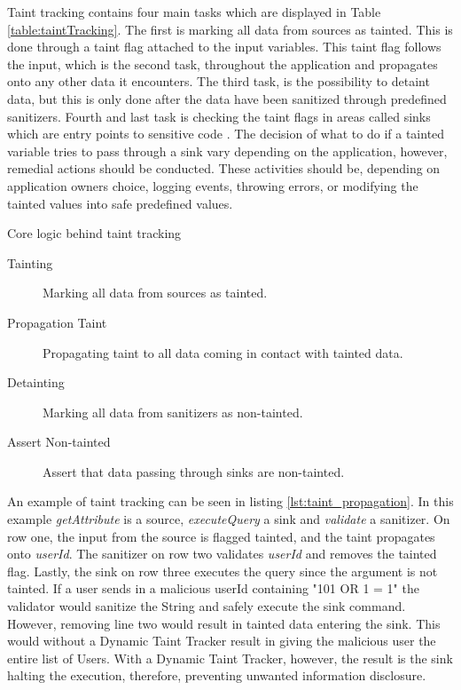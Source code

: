 Taint tracking contains four main tasks which are displayed in Table \ref{table:taintTracking}. The first is marking all data from sources as tainted. This is done through a taint flag attached to the input variables. This taint flag follows the input, which is the second task, throughout the application and propagates onto any other data it encounters. The third task, is the possibility to detaint data, but this is only done after the data have been sanitized through predefined sanitizers. Fourth and last task is checking the taint flags in areas called sinks which are entry points to sensitive code \parencite{Pan2015, Venkataramani2008}. The decision of what to do if a tainted variable tries to pass through a sink vary depending on the application, however, remedial actions should be conducted. These activities should be, depending on application owners choice, logging events, throwing errors, or modifying the tainted values into safe predefined values. 

\begin{table}[!hbt]
  \centering
  \caption{Core logic behind taint tracking}
  \label{table:taintTracking}
  \begin{description}
    \item [Tainting] Marking all data from sources as tainted.
    \item [Propagation Taint] Propagating taint to all data coming in contact with tainted data.
    \item [Detainting] Marking all data from sanitizers as non-tainted.
    \item [Assert Non-tainted] Assert that data passing through sinks are non-tainted. 
  \end{description}
\end{table}

An example of taint tracking can be seen in listing \ref{lst:taint_propagation}. In this example \textit{getAttribute} is a source, \textit{executeQuery} a sink and \textit{validate} a sanitizer. On row one, the input from the source is flagged tainted, and the taint propagates onto \textit{userId}. The sanitizer on row two validates \textit{userId} and removes the tainted flag. Lastly, the sink on row three executes the query since the argument is not tainted. If a user sends in a malicious userId containing "101 OR 1 = 1" the validator would sanitize the String and safely execute the sink command. However, removing line two would result in tainted data entering the sink. This would without a Dynamic Taint Tracker result in giving the malicious user the entire list of Users. With a Dynamic Taint Tracker, however, the result is the sink halting the execution, therefore, preventing unwanted information disclosure.


